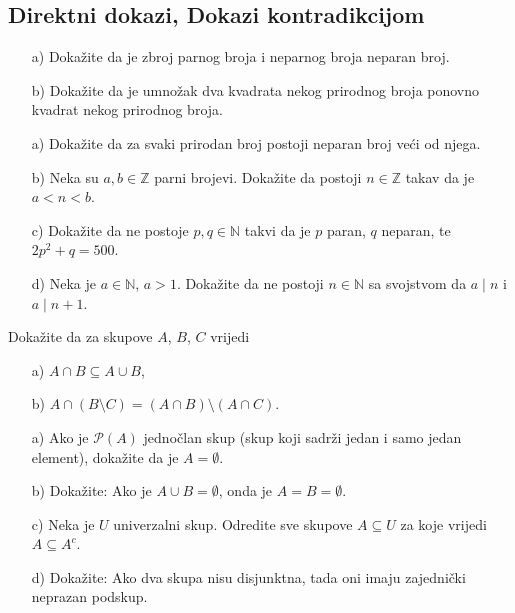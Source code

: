 \subsection*{Direktni dokazi, Dokazi kontradikcijom}
\begin{exercise} \textbf{}
\begin{itemize}
\item[a)] Dokažite da je zbroj parnog broja i neparnog broja neparan broj.
\item[b)] Dokažite da je umnožak dva kvadrata nekog prirodnog broja ponovno kvadrat nekog prirodnog broja.
\end{itemize}
\end{exercise}
\begin{exercise} \textbf{}
\begin{itemize}
\item[a)] Dokažite da za svaki prirodan broj postoji neparan broj veći od njega.
\item[b)] Neka su $a, b\in \mathbb{Z}$ parni brojevi. Dokažite da postoji $n\in \mathbb{Z}$ takav da je $a<n<b$.
\item[c)] Dokažite da ne postoje $p, q\in \mathbb{N}$ takvi da je $p$ paran, $q$ neparan, te $2p^2+q=500$.
\item[d)] Neka je $a\in \mathbb{N}$, $a>1$. Dokažite da ne postoji $n\in \mathbb{N}$ sa svojstvom da $a \mid n$ i $a \mid n+1$.
\end{itemize}
\end{exercise}
\begin{exercise}
Dokažite da za skupove $A$, $B$, $C$ vrijedi
\begin{itemize}
\item[a)] $A\cap B\subseteq A\cup B$,
\item[b)] $A\cap (B\setminus C)=(A\cap B)\setminus (A\cap C)$.
\end{itemize}
\end{exercise}
\begin{exercise} \textbf{} 
\begin{itemize}
\item[a)] Ako je $\mathcal{P}(A)$ jednočlan skup (skup koji sadrži jedan i samo jedan element), dokažite da je $A=\emptyset$.
\item[b)] Dokažite: Ako je $A\cup B=\emptyset$, onda je $A=B=\emptyset$.
\item[c)] Neka je $U$ univerzalni skup. Odredite sve skupove $A\subseteq U$ za koje vrijedi $A\subseteq A^c$.
\item[d)] Dokažite: Ako dva skupa nisu disjunktna, tada oni imaju zajednički neprazan podskup.
\end{itemize}
\end{exercise}
